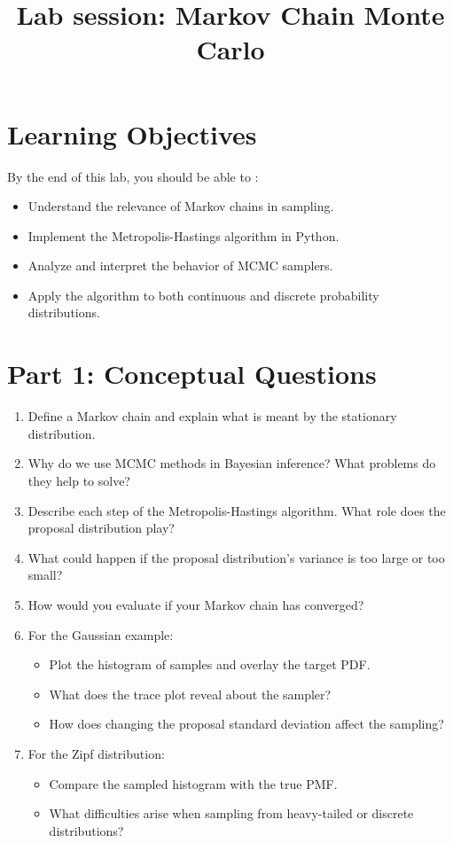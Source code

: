 \documentclass[12pt]{article}
\title{\bfseries \Huge Lab session: Markov Chain Monte Carlo}
\author{}
\date{}
\begin{document}
	\maketitle
	
	\section*{Learning Objectives}
	By the end of this lab, you should be able to :
	\begin{itemize}
		\item Understand the relevance of Markov chains in sampling.
		\item Implement the Metropolis-Hastings algorithm in Python.
		\item Analyze and interpret the behavior of MCMC samplers.
		\item Apply the algorithm to both continuous and discrete probability distributions.
	\end{itemize}
	
	\section*{Part 1: Conceptual Questions}
	
	\begin{enumerate}[label=\textbf{Q\arabic*.}]
		\item Define a Markov chain and explain what is meant by the stationary distribution.
		
		\item Why do we use MCMC methods in Bayesian inference? What problems do they help to solve?
		
		\item Describe each step of the Metropolis-Hastings algorithm. What role does the proposal distribution play?
		
		\item What could happen if the proposal distribution’s variance is too large or too small?
		
		\item How would you evaluate if your Markov chain has converged?
		
		\item For the Gaussian example:
		\begin{itemize}
			\item Plot the histogram of samples and overlay the target PDF.
			\item What does the trace plot reveal about the sampler?
			\item How does changing the proposal standard deviation affect the sampling?
		\end{itemize}
		
		\item For the Zipf distribution:
		\begin{itemize}
			\item Compare the sampled histogram with the true PMF.
			\item What difficulties arise when sampling from heavy-tailed or discrete distributions?
		\end{itemize}
	\end{enumerate}
	
\end{document}
